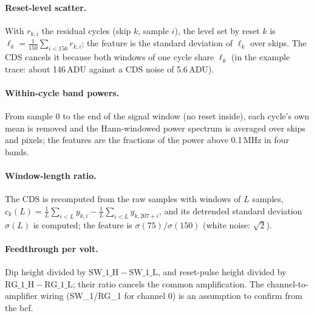\documentclass[10pt]{article}
\begin{document}
\paragraph{Reset-level scatter.} With $r_{k,i}$ the residual cycles (skip $k$, sample $i$), the level set by reset $k$ is
$\ell_k=\frac{1}{150}\sum_{i<150} r_{k,i}$; the feature is the standard deviation of $\ell_k$ over skips. The CDS cancels it
because both windows of one cycle share $\ell_k$ (in the example trace: about 146\,ADU against a CDS noise of 5.6\,ADU).

\paragraph{Within-cycle band powers.} From sample 0 to the end of the signal window (no reset inside), each cycle's own mean is
removed and the Hann-windowed power spectrum is averaged over skips and pixels; the features are the fractions of the power
above 0.1\,MHz in four bands.

\paragraph{Window-length ratio.} The CDS is recomputed from the raw samples with windows of $L$ samples,
$c_k(L)=\frac{1}{L}\sum_{i<L}y_{k,i}-\frac{1}{L}\sum_{i<L}y_{k,207+i}$, and its detrended standard deviation $\sigma(L)$ is
computed; the feature is $\sigma(75)/\sigma(150)$ (white noise: $\sqrt{2}$).

\paragraph{Feedthrough per volt.} Dip height divided by $\mathrm{SW\_1\_H}-\mathrm{SW\_1\_L}$, and reset-pulse height divided by
$\mathrm{RG\_1\_H}-\mathrm{RG\_1\_L}$; their ratio cancels the common amplification. The channel-to-amplifier wiring (SW\_1/RG\_1
for channel 0) is an assumption to confirm from the bcf.
\end{document}
